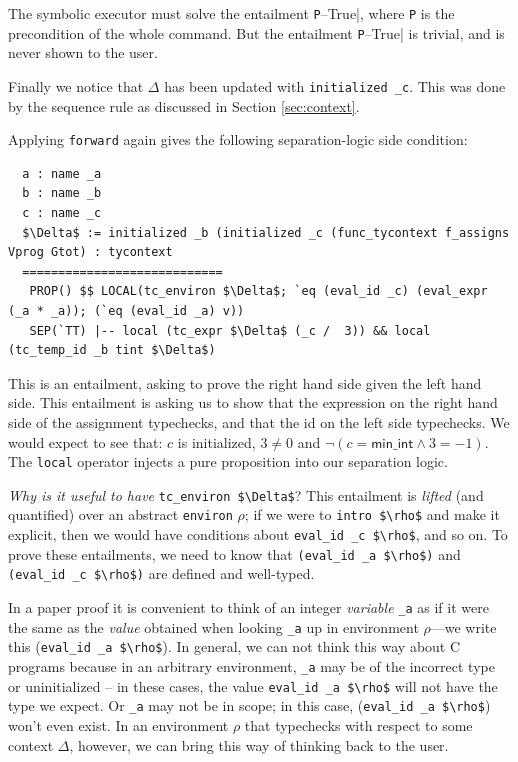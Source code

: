 \documentclass{puthesis}
\begin{document}
The symbolic executor must solve the entailment \lstinline|P|--True|,
where 
\lstinline|P| is the
precondition of the whole command.  But the entailment
\lstinline|P|--True| is trivial, and is never shown to the user.

Finally we notice that $\Delta$ has been updated with 
\lstinline|initialized _c|. This was done by the sequence rule as discussed in
Section \ref{sec:context}.

Applying \lstinline|forward| again gives 
the following separation-logic side condition: 

\begin{lstlisting}
  a : name _a
  b : name _b
  c : name _c
  $\Delta$ := initialized _b (initialized _c (func_tycontext f_assigns Vprog Gtot) : tycontext 
  ============================
   PROP() $$ LOCAL(tc_environ $\Delta$; `eq (eval_id _c) (eval_expr (_a * _a)); (`eq (eval_id _a) v)) 
   SEP(`TT) |-- local (tc_expr $\Delta$ (_c /  3)) && local (tc_temp_id _b tint $\Delta$)
\end{lstlisting}
\noindent This is an entailment, asking to prove the right hand side
given the left hand side. This entailment is asking us to show that
the expression on the right hand side of the assignment typechecks,
and that the id on the left side typechecks. We would expect to see
that: $c$ is initialized, $3\neq 0$ and $\neg(c=\mathsf{min\_int}
\wedge 3 = -1)$. The \lstinline|local| operator injects a pure
proposition into our separation logic.

\emph{Why is it useful to have} \lstinline{tc_environ $\Delta$}?
This entailment is \emph{lifted} (and quantified) over an abstract
\lstinline|environ| $\rho$; if we were to \lstinline|intro $\rho$| and make it
explicit, then we would have conditions about \lstinline{eval_id _c $\rho$},
and so on.  
To prove these entailments, we need to know that
\lstinline{(eval_id _a $\rho$)}  and 
\lstinline{(eval_id _c $\rho$)}  are defined and well-typed.

In a paper proof it is convenient to think of an integer
\emph{variable} \lstinline{_a} as if it were the same as the
\emph{value} obtained when looking \lstinline{_a} up in environment
$\rho$---we write this (\lstinline|eval_id _a $\rho$|). In general, we
can not think this way about C programs because in an arbitrary
environment, \lstinline|_a| may be of the incorrect type or
uninitialized -- in these cases, the value 
\lstinline|eval_id _a $\rho$| will not have the type we expect.  Or \lstinline|_a| may not
be in scope; in this case, (\lstinline|eval_id _a $\rho$|) won't even exist. In
an environment $\rho$ that typechecks with respect to some context
$\Delta$, however, we can bring this way of thinking back to the user.
\end{document}
